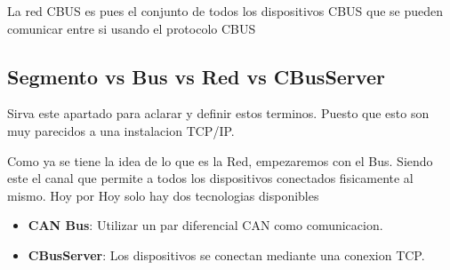 La red CBUS es pues el conjunto de todos los dispositivos CBUS que se pueden comunicar entre si
usando el protocolo CBUS

\subsection{Segmento vs Bus vs Red vs CBusServer}
Sirva este apartado para aclarar y definir estos terminos. Puesto que esto son muy parecidos a una instalacion
TCP/IP.

Como ya se tiene la idea de lo que es la Red, empezaremos con el Bus. Siendo este el canal que permite
a todos los dispositivos conectados fisicamente al mismo. Hoy por Hoy solo hay dos tecnologias disponibles
\begin{itemize}
    \item \textbf{CAN Bus}: Utilizar un par diferencial CAN como comunicacion.
    \item \textbf{CBusServer}: Los dispositivos se conectan mediante una conexion TCP.
\end{itemize}